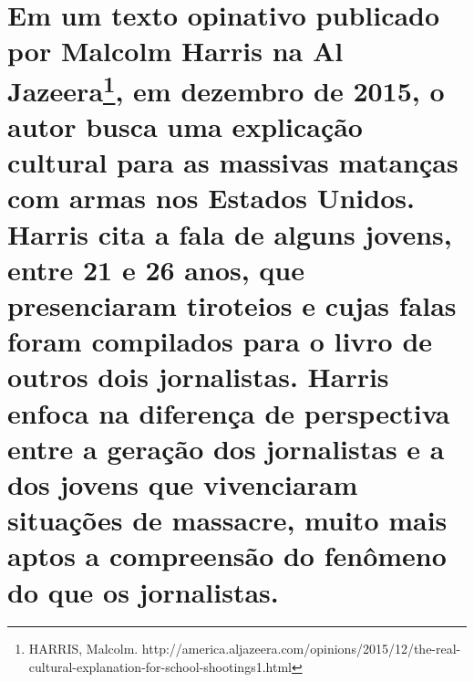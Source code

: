 \section[Em um texto opinativo publicado por Malcolm Harris na Al
Jazeera, em dezembro de 2015, o autor busca uma explicação cultural para
as massivas matanças com armas nos Estados Unidos. Harris cita a fala de
alguns jovens, entre 21 e 26 anos, que presenciaram tiroteios e cujas
falas foram compilados para o livro de outros dois jornalistas. Harris
enfoca na diferença de perspectiva entre a geração dos jornalistas e a
dos jovens que vivenciaram situações de massacre, muito mais aptos a
compreensão do fenômeno do que os jornalistas. ]{\texorpdfstring{Em um
texto opinativo publicado por Malcolm Harris na Al Jazeera\footnote{HARRIS,
  Malcolm.
  http://america.aljazeera.com/opinions/2015/12/the-real-cultural-explanation-for-school-shootings1.html},
em dezembro de 2015, o autor busca uma explicação cultural para as
massivas matanças com armas nos Estados Unidos. Harris cita a fala de
alguns jovens, entre 21 e 26 anos, que presenciaram tiroteios e cujas
falas foram compilados para o livro de outros dois jornalistas. Harris
enfoca na diferença de perspectiva entre a geração dos jornalistas e a
dos jovens que vivenciaram situações de massacre, muito mais aptos a
compreensão do fenômeno do que os jornalistas.
}{Em um texto opinativo publicado por Malcolm Harris na Al Jazeera, em dezembro de 2015, o autor busca uma explicação cultural para as massivas matanças com armas nos Estados Unidos. Harris cita a fala de alguns jovens, entre 21 e 26 anos, que presenciaram tiroteios e cujas falas foram compilados para o livro de outros dois jornalistas. Harris enfoca na diferença de perspectiva entre a geração dos jornalistas e a dos jovens que vivenciaram situações de massacre, muito mais aptos a compreensão do fenômeno do que os jornalistas. }}\label{em-um-texto-opinativo-publicado-por-malcolm-harris-na-al-jazeera-em-dezembro-de-2015-o-autor-busca-uma-explicauxe7uxe3o-cultural-para-as-massivas-matanuxe7as-com-armas-nos-estados-unidos.-harris-cita-a-fala-de-alguns-jovens-entre-21-e-26-anos-que-presenciaram-tiroteios-e-cujas-falas-foram-compilados-para-o-livro-de-outros-dois-jornalistas.-harris-enfoca-na-diferenuxe7a-de-perspectiva-entre-a-gerauxe7uxe3o-dos-jornalistas-e-a-dos-jovens-que-vivenciaram-situauxe7uxf5es-de-massacre-muito-mais-aptos-a-compreensuxe3o-do-fenuxf4meno-do-que-os-jornalistas.}

